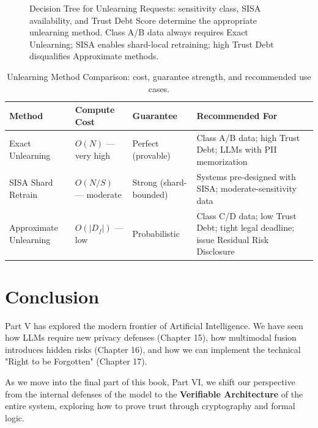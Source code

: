 \begin{figure}[ht]
\caption{Decision Tree for Unlearning Requests: sensitivity class, SISA availability, and Trust Debt Score determine the appropriate unlearning method. Class A/B data always requires Exact Unlearning; SISA enables shard-local retraining; high Trust Debt disqualifies Approximate methods.}
\label{fig:unlearning_decision_tree}
\end{figure}

\begin{table}[ht]
\centering
\caption{Unlearning Method Comparison: cost, guarantee strength, and recommended use cases.}
\label{tab:unlearning_comparison}
\renewcommand{\arraystretch}{1.4}
\begin{tabular}{p{3cm} p{2.3cm} p{2.5cm} p{4.5cm}}
\toprule
\textbf{Method} & \textbf{Compute Cost} & \textbf{Guarantee} & \textbf{Recommended For} \\
\midrule
Exact Unlearning & $O(N)$ --- very high & Perfect (provable) & Class A/B data; high Trust Debt; LLMs with PII memorization \\
SISA Shard Retrain & $O(N/S)$ --- moderate & Strong (shard-bounded) & Systems pre-designed with SISA; moderate-sensitivity data \\
Approximate Unlearning & $O(|D_f|)$ --- low & Probabilistic & Class C/D data; low Trust Debt; tight legal deadline; issue Residual Risk Disclosure \\
\bottomrule
\end{tabular}
\end{table}

\section{Conclusion}
\label{sec:conclusion_unlearning_ch17}

Part V has explored the modern frontier of Artificial Intelligence. We have seen how LLMs require new privacy defenses (Chapter 15), how multimodal fusion introduces hidden risks (Chapter 16), and how we can implement the technical "Right to be Forgotten" (Chapter 17). 

As we move into the final part of this book, Part VI, we shift our perspective from the internal defenses of the model to the \textbf{Verifiable Architecture} of the entire system, exploring how to prove trust through cryptography and formal logic.


